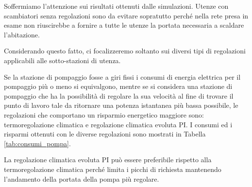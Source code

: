 \documentclass[laurea,oneside,11pt]{USiena_tesiLM}
\begin{document}
Soffermiamo l'attenzione sui risultati ottenuti dalle simulazioni. Utenze con scambiatori senza regolazioni sono da evitare sopratutto perché nella rete presa in esame non riuscirebbe a fornire a tutte le utenze la portata necessaria a scaldare l'abitazione.

Considerando questo fatto, ci focalizzeremo soltanto sui diversi tipi di regolazioni applicabili alle sotto-stazioni di utenza. 

Se la stazione di pompaggio fosse a giri fissi i consumi di energia elettrica per il pompaggio più o meno si equivalgono, mentre se si considera una stazione di pompaggio che ha la possibilità di regolare la sua velocità al fine di trovare il punto di lavoro tale da ritornare una potenza istantanea più bassa possibile, le regolazioni che comportano un risparmio energetico maggiore sono: termoregolazione climatica e regolazione climatica evoluta PI. I consumi ed i risparmi ottenuti con le diverse regolazioni sono mostrati in Tabella \ref{tab:consumi_pompa}.

La regolazione climatica evoluta PI può essere preferibile rispetto alla termoregolazione climatica perché limita i picchi di richiesta mantenendo l'andamento della portata della pompa più regolare.
 
\end{document}
